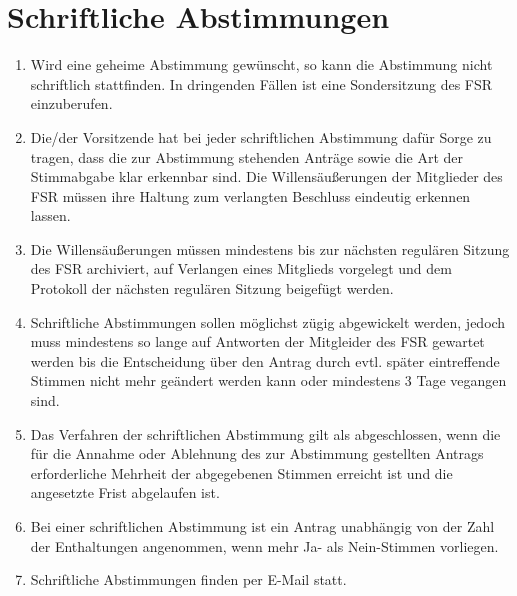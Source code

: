 \documentclass[
	a4paper,
	12pt,
	oneside,
	parskip=half-,
	pagesize,
	headsepline,
	german,
	ngerman
]{scrartcl}
\begin{document}
\section{Schriftliche Abstimmungen}
\label{sec:schriftlich}
\begin{enumerate}
	\item Wird eine geheime Abstimmung gewünscht, so kann die Abstimmung nicht schriftlich stattfinden. In dringenden Fällen ist eine Sondersitzung des FSR einzuberufen.
	\item Die/der Vorsitzende hat bei jeder schriftlichen Abstimmung dafür Sorge zu tragen, dass die zur Abstimmung stehenden Anträge sowie die Art der Stimmabgabe klar erkennbar sind. Die Willensäußerungen der Mitglieder des FSR müssen ihre Haltung zum verlangten Beschluss eindeutig erkennen lassen.
	\item Die Willensäußerungen müssen mindestens bis zur nächsten regulären Sitzung des FSR archiviert, auf Verlangen eines Mitglieds vorgelegt und dem Protokoll der nächsten regulären Sitzung beigefügt werden.
	\item Schriftliche Abstimmungen sollen möglichst zügig abgewickelt werden, jedoch muss mindestens so lange auf Antworten der Mitgleider des FSR gewartet werden bis die Entscheidung über den Antrag durch evtl. später eintreffende Stimmen nicht mehr geändert werden kann oder mindestens 3 Tage vegangen sind.
	\item Das Verfahren der schriftlichen Abstimmung gilt als abgeschlossen, wenn die für die Annahme oder Ablehnung des zur Abstimmung gestellten Antrags erforderliche Mehrheit der abgegebenen Stimmen erreicht ist und die angesetzte Frist abgelaufen ist.
	\item Bei einer schriftlichen Abstimmung ist ein Antrag unabhängig von der Zahl der Enthaltungen angenommen, wenn mehr Ja- als Nein-Stimmen vorliegen.
	\item Schriftliche Abstimmungen finden per E-Mail statt.
	
\end{enumerate}
\end{document}
